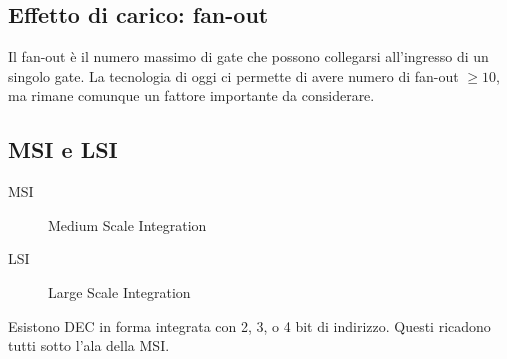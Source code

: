\documentclass{subfiles}
\begin{document}
\subsection{Effetto di carico: fan-out}

Il fan-out è il numero massimo di gate che possono collegarsi all'ingresso di un singolo gate.
La tecnologia di oggi ci permette di avere numero di fan-out $\geq 10$, ma rimane comunque un fattore importante da considerare.

\subsection{MSI e LSI}

\begin{description}
    \item[MSI] Medium Scale Integration
    \item[LSI] Large Scale Integration
\end{description}

\noindent
Esistono DEC in forma integrata con 2, 3, o 4 bit di indirizzo.
Questi ricadono tutti sotto l'ala della MSI.
\end{document}
